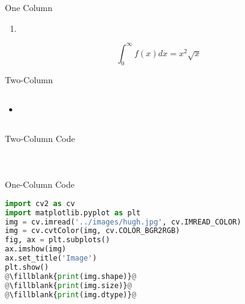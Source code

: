 
\begin{frame}{One Column}
    \begin{enumerate}
      \item
    \end{enumerate}
    \begin{equation}\label{l}
        \int_0^\infty f(x)dx = x^2\sqrt{x}
    \end{equation}
\end{frame}


\begin{frame}[t,fragile]{Two-Column}
    \begin{columns}[t]
        \begin{itemize}
            \item
        \end{itemize}
            \begin{figure}
              \centering
              \caption{}
            \end{figure}
    \end{columns}

\end{frame}

\begin{frame}[fragile]{Two-Column Code}
    \begin{columns}[t]
           \begin{lstlisting}[caption=A Grayscale Image, language=Python, escapechar=\@]
    %matplotlib inline

            \end{lstlisting}
           \begin{lstlisting}[caption=A Color Image,language=Python, escapechar=\@]
    %matplotlib inline

             \end{lstlisting}
    \end{columns}
\end{frame}

\begin{frame}[t, fragile]{One-Column Code}
    \begin{lstlisting}[caption=Displaying  Image Properties, language=Python, escapechar=\@]
%matplotlib inline
import cv2 as cv
import matplotlib.pyplot as plt
img = cv.imread('../images/hugh.jpg', cv.IMREAD_COLOR)
img = cv.cvtColor(img, cv.COLOR_BGR2RGB)
fig, ax = plt.subplots()
ax.imshow(img)
ax.set_title('Image')
plt.show()
@\fillblank{print(img.shape)}@
@\fillblank{print(img.size)}@
@\fillblank{print(img.dtype)}@
    \end{lstlisting}
\end{frame} 


